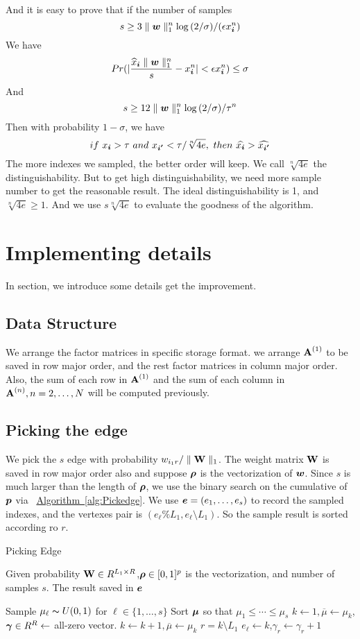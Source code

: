 \documentclass[letterpaper]{article}
\newcommand{\V}[1]{{\bm{{\MakeLowercase{#1}}}}}
\newcommand{\M}[1]{{\bm{\mathbf{\MakeUppercase{#1}}}}}
\newcommand{\Mn}[2]{\M{#1}^{(#2)}}
\newcommand{\norm}[2]{\parallel#1\parallel_{#2}}
\newcommand{\Alg}[1] {\hyperref[alg:#1] {Algorithm~\ref*{alg:#1}}}
\begin{document}
And it is easy to prove that if the number of samples
\[
s \geq 3\norm{\V{w}}{1}^n\log{(2/\sigma)}/(\epsilon x^n_{\V{i}})
\]
We have
\[
Pr(|\frac{\widehat{x}_\V{i}\norm{\V{w}}{1}^n}{s} - x^n_{\V{i}}| < \epsilon x^n_{\V{i}}) \leq \sigma
\]
And
\[
    s \geq 12\norm{\V{w}}{1}^n\log{(2/\sigma)}/\tau^n
\]
Then with probability $1-\sigma$, we have
\[
if\ x_{\V{i}} > \tau\ and \ x_{\V{i'}} < \tau/\sqrt[n]{4e}, \ then\ \widehat{x_{\V{i}}} > \widehat{x_{\V{i'}}}
\]
The more indexes we sampled, the better order will keep. We call $\sqrt[n]{4e}$ the distinguishability. But to get high distinguishability, we need more sample number to get the reasonable result. The ideal distinguishability is 1, and  $\sqrt[n]{4e} \geq 1$. And we use $s\sqrt[n]{4e}$ to evaluate the goodness of the algorithm.
\section{Implementing details}
In section, we introduce some details get the improvement.
\subsection{Data Structure}
We arrange the factor matrices in specific storage format. we arrange $\Mn{A}{1}$ to be saved in row major order, and the rest factor matrices in column major order. Also, the sum of each row in $\Mn{A}{1}$ and the sum of each column in $\Mn{A}{n},n=2,\ldots,N$ will be computed previously.

\subsection{Picking the edge}
We pick the $s$ edge with probability  $w_{i_1r}/\norm{\M{W}}{1}$. The weight matrix $\M{W}$ is saved in row major order also and suppose $\V{\rho}$ is the vectorization of $\V{W}$. Since $s$ is much larger than the length of $\V{\rho}$, we use the binary search on the cumulative of $\V{p}$ via ~\Alg{Pickedge}. We use $\V{e}=(e_1,\ldots,e_s)$ to record the sampled indexes, and the vertexes pair is $(e_{\ell}\%L_1,e_{\ell}\setminus L_1)$. So the sample result is sorted according ro $r$.

\begin{algorithm}[ht]
    \caption{Picking Edge}
    \label{alg:Pickedge}
    Given probability $\M{W}\in R^{L_1\times R}$,$\V{\rho}\in[0,1]^p$ is the vectorization, and number of samples $s$.
    The result saved in $\V{e}$
    \begin{algorithmic}[1]
    \State Sample $\mu_{\ell} \thicksim U(0,1)$ for $\ell \in \{1,\ldots,s\}$
    \State Sort $\V{\mu}$ so that $\mu_1 \leq \cdots\leq\mu_s$
    \State $k \leftarrow 1,\overline{\mu} \leftarrow \mu_k$,$\V{\gamma}\in R^R\leftarrow$ all-zero vector.
    \While {$\mu_{\ell} > \overline{\mu}$}
    \State $k \leftarrow k+1,\overline{\mu} \leftarrow \mu_k$
    \EndWhile
    \State $r = k \setminus L_1$
    \State $e_{\ell}\leftarrow k$,$\gamma_{r}\leftarrow \gamma_{r} + 1$
    \EndFor
    \end{algorithmic}
\end{algorithm}
\end{document}
